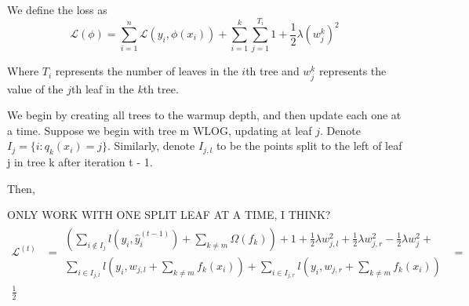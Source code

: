 \documentclass{article}
\begin{document}
We define the loss as \[
\mathcal{L}(\phi) = \sum_{i=1}^n \mathcal{L}(y_i, \phi(x_i)) + \sum_{i=1}^k \sum_{j=1}^{T_i} 1 + \frac{1}{2} \lambda (w^k_j)^2
\]

Where $T_i$ represents the number of leaves in the $i$th tree and $w^k_j$ represents the value of the $j$th leaf in the $k$th tree.

We begin by creating all trees to the warmup depth, and then update each one at a time. Suppose
we begin with tree m WLOG, updating at leaf $j$. Denote $I_j = \{i: q_k(x_i) = j\}$. Similarly, denote $I_{j, l}$ to be the points
split to the left of leaf j in tree k after iteration t - 1.

Then, 

ONLY WORK WITH ONE SPLIT LEAF AT A TIME, I THINK?
\begin{align*}
    \mathcal{L}^{(t)} &=
    \begin{split}
        \left(\sum_{i \notin I_j} l(y_i, \hat{y}_i^{(t - 1)}) + \sum_{k \neq m} \Omega(f_k) \right) + 1 + \frac{1}{2} \lambda w_{j, l}^2 + \frac{1}{2} \lambda w_{j, r}^2 - \frac{1}{2} \lambda w_{j}^2 +  \\
    \sum_{i \in I_{j,l}} l\left(y_i, w_{j, l} + \sum_{k \neq m} f_k(x_i)\right) +  \sum_{i \in I_{j,r}} l\left(y_i, w_{j, r} + \sum_{k \neq m} f_k(x_i)\right)
    \end{split} &= \\
      \frac{1}{2}
\end{align*}
\end{document}

